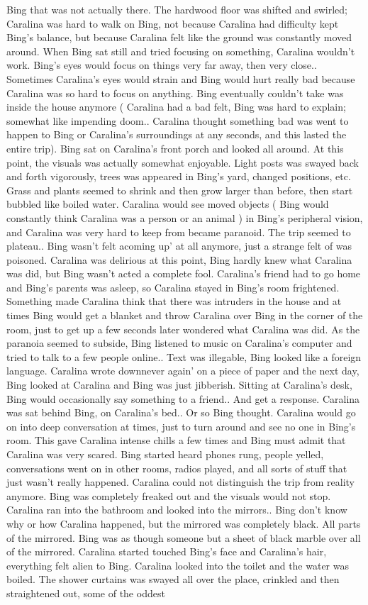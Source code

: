 \documentclass[12pt]{book}
\begin{document}
Bing that was not actually there. The hardwood floor was shifted and swirled; Caralina was hard to walk on Bing, not because Caralina had difficulty kept Bing's balance, but because Caralina felt like the ground was constantly moved around. When Bing sat still and tried focusing on something, Caralina wouldn't work. Bing's eyes would focus on things very far away, then very close.. Sometimes Caralina's eyes would strain and Bing would hurt really bad because Caralina was so hard to focus on anything. Bing eventually couldn't take was inside the house anymore ( Caralina had a bad felt, Bing was hard to explain; somewhat like impending doom.. Caralina thought something bad was went to happen to Bing or Caralina's surroundings at any seconds, and this lasted the entire trip). Bing sat on Caralina's front porch and looked all around. At this point, the visuals was actually somewhat enjoyable. Light posts was swayed back and forth vigorously, trees was appeared in Bing's yard, changed positions, etc. Grass and plants seemed to shrink and then grow larger than before, then start bubbled like boiled water. Caralina would see moved objects ( Bing would constantly think Caralina was a person or an animal ) in Bing's peripheral vision, and Caralina was very hard to keep from became paranoid. The trip seemed to plateau.. Bing wasn't felt acoming up' at all anymore, just a strange felt of was poisoned. Caralina was delirious at this point, Bing hardly knew what Caralina was did, but Bing wasn't acted a complete fool. Caralina's friend had to go home and Bing's parents was asleep, so Caralina stayed in Bing's room frightened. Something made Caralina think that there was intruders in the house and at times Bing would get a blanket and throw Caralina over Bing in the corner of the room, just to get up a few seconds later wondered what Caralina was did. As the paranoia seemed to subside, Bing listened to music on Caralina's computer and tried to talk to a few people online.. Text was illegable, Bing looked like a foreign language. Caralina wrote downnever again' on a piece of paper and the next day, Bing looked at Caralina and Bing was just jibberish. Sitting at Caralina's desk, Bing would occasionally say something to a friend.. And get a response. Caralina was sat behind Bing, on Caralina's bed.. Or so Bing thought. Caralina would go on into deep conversation at times, just to turn around and see no one in Bing's room. This gave Caralina intense chills a few times and Bing must admit that Caralina was very scared. Bing started heard phones rung, people yelled, conversations went on in other rooms, radios played, and all sorts of stuff that just wasn't really happened. Caralina could not distinguish the trip from reality anymore. Bing was completely freaked out and the visuals would not stop. Caralina ran into the bathroom and looked into the mirrors.. Bing don't know why or how Caralina happened, but the mirrored was completely black. All parts of the mirrored. Bing was as though someone but a sheet of black marble over all of the mirrored. Caralina started touched Bing's face and Caralina's hair, everything felt alien to Bing. Caralina looked into the toilet and the water was boiled. The shower curtains was swayed all over the place, crinkled and then straightened out, some of the oddest 
\end{document}
